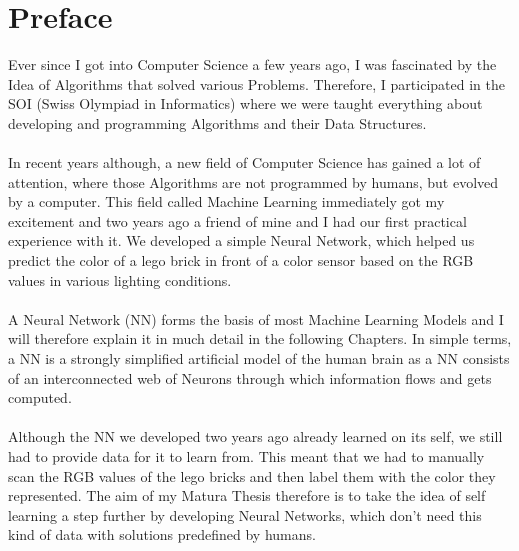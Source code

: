 \documentclass[11pt]{report}
\begin{document}
    \section{Preface}\label{sec:preface}
    Ever since I got into Computer Science a few years ago, I was fascinated by the Idea of Algorithms that solved various Problems.
    Therefore, I participated in the SOI (Swiss Olympiad in Informatics) where we were taught everything about developing and programming Algorithms and their Data Structures.
    \\ \\
    In recent years although, a new field of Computer Science has gained a lot of attention, where those Algorithms are not programmed by humans, but evolved by a computer.
    This field called Machine Learning immediately got my excitement and two years ago a friend of mine and I had our first practical experience with it.
    We developed a simple Neural Network, which helped us predict the color of a lego brick in front of a color sensor based on the RGB values in various lighting conditions.
    \\ \\
    A Neural Network (NN) forms the basis of most Machine Learning Models and I will therefore explain it in much detail in the following Chapters.
    In simple terms, a NN is a strongly simplified artificial model of the human brain as a NN consists of an interconnected web of Neurons through which information flows and gets computed.
    \\ \\
    Although the NN we developed two years ago already learned on its self, we still had to provide data for it to learn from.
    This meant that we had to manually scan the RGB values of the lego bricks and then label them with the color they represented.
    The aim of my Matura Thesis therefore is to take the idea of self learning a step further by developing Neural Networks, which don't need this kind of data with solutions predefined by humans.
\end{document}
